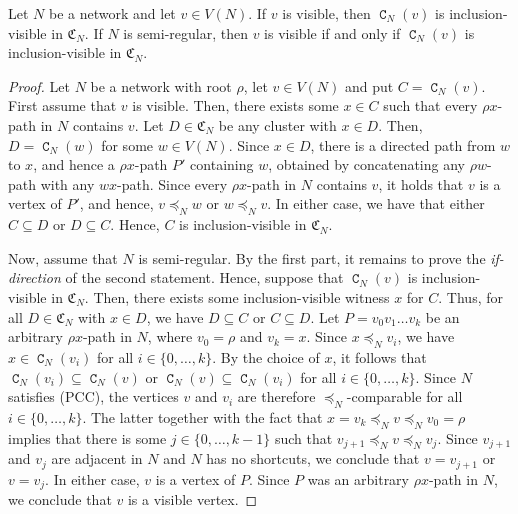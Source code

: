 \documentclass[10pt,a4paper]{amsart}
\DeclareMathOperator{\CC}{\mathtt{C}}
\newcommand{\CS}[1][]{\ensuremath{\mathfrak{C}_{#1}}}
\begin{document}
\begin{lemma}\label{lem:visible-semiregular}
    Let $N$ be a network and let $v\in V(N)$. If $v$ is visible, then
    $\CC_N(v)$ is inclusion-visible in $\CS[N]$. If $N$ is semi-regular, then $v$ is
    visible if and only if $\CC_N(v)$ is inclusion-visible in $\CS[N]$.
\end{lemma}

\begin{proof}
	Let $N$ be a network with root $\rho$, let $v\in V(N)$ and put $C=\CC_N(v)$. First assume that
	$v$ is visible.
	Then, there exists some $x\in C$ such that every $\rho x$-path in $N$ contains $v$. Let
	$D\in\CS[N]$ be any cluster with $x\in D$. Then, $D=\CC_N(w)$ for some $w\in V(N)$.
	Since $x\in D$, there is a
	directed path from $w$ to $x$, and hence a $\rho x$-path $P'$ containing $w$, obtained by
	concatenating any $\rho w$-path with any $wx$-path.
	Since every $\rho x$-path in $N$ contains $v$, it holds that $v$ is a vertex of $P'$, and
	hence, $v\preceq_N w$ or $w\preceq_N v$. In either case, we have that either $C\subseteq D$ or
	$D\subseteq C$. Hence, $C$ is inclusion-visible in $\CS[N]$.
	
	Now, assume that $N$ is semi-regular. By the first part, it remains to prove the
	\emph{if-direction} of the second statement.
 	Hence, suppose that $\CC_N(v)$ is inclusion-visible in $\CS[N]$. Then, there exists some
	inclusion-visible witness $x$ for $C$. Thus,
	for all $D\in\CS[N]$ with $x\in D$, we have $D\subseteq C$ or $C\subseteq D$.
	Let $P=v_0v_1\ldots v_k$ be an arbitrary $\rho x$-path in $N$, where $v_0=\rho$ and $v_k=x$.
	Since $x\preceq_N v_i$, we have  $x\in \CC_N(v_i)$ for all $i\in\{0,\ldots,k\}$. 
	By the choice of $x$, it follows that $\CC_N(v_i)\subseteq \CC_N(v)$ or
	$\CC_N(v)\subseteq \CC_N(v_i)$ for all $i\in\{0,\ldots,k\}$. Since $N$ satisfies 
	(PCC), the vertices $v$ and $v_i$ are therefore $\preceq_N$-comparable for all
	$i\in\{0,\ldots,k\}$. The latter together with the fact that $x=v_k\preceq_N v\preceq_N v_0=\rho$
	implies that there is some $j\in\{0,\ldots,k-1\}$ such that $v_{j+1}\preceq_N v\preceq_N v_j$.
	Since $v_{j+1}$ and $v_j$ are adjacent in $N$ and $N$ has no shortcuts, we conclude that
	$v=v_{j+1}$ or $v=v_j$. In either case, $v$ is a vertex of $P$. Since $P$ was an
	arbitrary $\rho x$-path in $N$, we conclude that $v$ is a visible vertex.
\end{proof}
\end{document}
